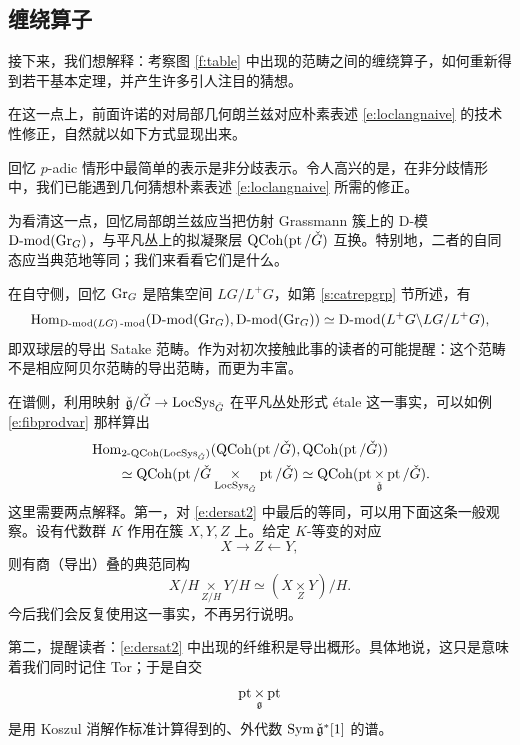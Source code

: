 \subsection{缠绕算子}

接下来，我们想解释：考察图 \ref{f:table} 中出现的范畴之间的缠绕算子，如何重新得到若干基本定理，并产生许多引人注目的猜想。

在这一点上，前面许诺的对局部几何朗兰兹对应朴素表述 \eqref{e:loclangnaive} 的技术性修正，自然就以如下方式显现出来。

\ssszh 回忆 $p$-adic 情形中最简单的表示是非分歧表示。令人高兴的是，在非分歧情形中，我们已能遇到几何猜想朴素表述 \eqref{e:loclangnaive} 所需的修正。

为看清这一点，回忆局部朗兰兹应当把仿射 Grassmann 簇上的 D-模 $\operatorname{D-mod}(\operatorname{Gr}_G)$，与平凡丛上的拟凝聚层 $\operatorname{QCoh}(\operatorname{pt}/\check{G})$ 互换。特别地，二者的自同态应当典范地等同；我们来看看它们是什么。

在自守侧，回忆 $\operatorname{Gr}_G$ 是陪集空间 $LG/L^+G$，如第 \ref{s:catrepgrp} 节所述，有
\begin{equation} \label{e:dersat1}
 \operatorname{Hom}_{\operatorname{D-mod}(LG)\operatorname{-mod}}( \operatorname{D-mod}(\operatorname{Gr}_G), \operatorname{D-mod}(\operatorname{Gr}_G)) \simeq \operatorname{D-mod}(L^+G \backslash
 LG / L^+G),
\end{equation}
即双球层的导出 Satake 范畴。作为对初次接触此事的读者的可能提醒：这个范畴不是相应阿贝尔范畴的导出范畴，而更为丰富。

在谱侧，利用映射 $\check{\mathfrak{g}} / \check{G} \rightarrow \operatorname{LocSys}_{\check{G}}$ 在平凡丛处形式 étale 这一事实，可以如例 \ref{e:fibprodvar} 那样算出
\begin{equation} \label{e:dersat2}
\begin{split}
&\operatorname{Hom}_{\operatorname{2-QCoh}(\operatorname{LocSys}_{\check{G}})}(\operatorname{QCoh}(\operatorname{pt}/\check{G}), \operatorname{QCoh}(\operatorname{pt}/\check{G})) \\
&\qquad \simeq \operatorname{QCoh}( \operatorname{pt}/\check{G} \underset{\operatorname{LocSys}_{\check{G}}} \times \operatorname{pt}/\check{G})
\simeq \operatorname{QCoh}( \operatorname{pt} \underset{\check{\mathfrak{g}}} \times \operatorname{pt} / \check{G}).
\end{split}
\end{equation}
这里需要两点解释。第一，对 \eqref{e:dersat2} 中最后的等同，可以用下面这条一般观察。设有代数群 $K$ 作用在簇 $X, Y, Z$ 上。给定 $K$-等变的对应
$$X \rightarrow Z \leftarrow Y,$$
则有商（导出）叠的典范同构
\[
      X/H \underset{Z/H} \times Y/H \simeq (X \underset Z \times Y)/H.
\]
今后我们会反复使用这一事实，不再另行说明。

第二，提醒读者：\eqref{e:dersat2} 中出现的纤维积是导出概形。具体地说，这只是意味着我们同时记住 Tor；于是自交
$$\operatorname{pt} \underset{ \mathfrak{g}} \times
\operatorname{pt}$$
是用 Koszul 消解作标准计算得到的、外代数 $\operatorname{Sym} \check{\mathfrak{g}}^*[1]$ 的谱。

